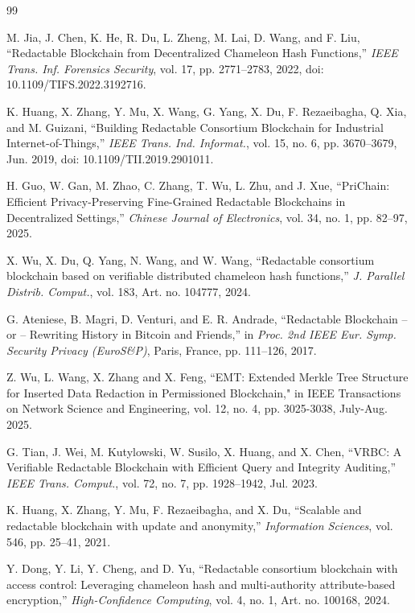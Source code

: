 \documentclass[lettersize,journal]{IEEEtran}
\begin{document}
\begin{thebibliography}{99}

M. Jia, J. Chen, K. He, R. Du, L. Zheng, M. Lai, D. Wang, and F. Liu,
``Redactable Blockchain from Decentralized Chameleon Hash Functions,''
\textit{IEEE Trans. Inf. Forensics Security}, vol. 17, pp. 2771--2783, 2022,
doi: 10.1109/TIFS.2022.3192716.

K. Huang, X. Zhang, Y. Mu, X. Wang, G. Yang, X. Du, F. Rezaeibagha, Q. Xia, and M. Guizani,
``Building Redactable Consortium Blockchain for Industrial Internet-of-Things,''
\textit{IEEE Trans. Ind. Informat.}, vol. 15, no. 6, pp. 3670--3679, Jun. 2019,
doi: 10.1109/TII.2019.2901011.

H. Guo, W. Gan, M. Zhao, C. Zhang, T. Wu, L. Zhu, and J. Xue,
``PriChain: Efficient Privacy-Preserving Fine-Grained Redactable Blockchains in Decentralized Settings,''
\textit{Chinese Journal of Electronics}, vol. 34, no. 1, pp. 82--97, 2025.

X. Wu, X. Du, Q. Yang, N. Wang, and W. Wang,
``Redactable consortium blockchain based on verifiable distributed chameleon hash functions,''
\textit{J. Parallel Distrib. Comput.}, vol. 183, Art. no. 104777, 2024.

G. Ateniese, B. Magri, D. Venturi, and E. R. Andrade,
``Redactable Blockchain -- or -- Rewriting History in Bitcoin and Friends,''
in \textit{Proc. 2nd IEEE Eur. Symp. Security Privacy (EuroS\&P)},
Paris, France, pp. 111--126, 2017.

Z. Wu, L. Wang, X. Zhang and X. Feng, ``EMT: Extended Merkle Tree Structure for Inserted Data Redaction in Permissioned Blockchain," in IEEE Transactions on Network Science and Engineering, vol. 12, no. 4, pp. 3025-3038, July-Aug. 2025.

G. Tian, J. Wei, M. Kutylowski, W. Susilo, X. Huang, and X. Chen,
``VRBC: A Verifiable Redactable Blockchain with Efficient Query and Integrity Auditing,''
\textit{IEEE Trans. Comput.}, vol. 72, no. 7, pp. 1928--1942, Jul. 2023.

K. Huang, X. Zhang, Y. Mu, F. Rezaeibagha, and X. Du,
``Scalable and redactable blockchain with update and anonymity,''
\textit{Information Sciences}, vol. 546, pp. 25--41, 2021.

Y. Dong, Y. Li, Y. Cheng, and D. Yu,
``Redactable consortium blockchain with access control: Leveraging chameleon hash and multi-authority attribute-based encryption,''
\textit{High-Confidence Computing}, vol. 4, no. 1, Art. no. 100168, 2024.


\end{thebibliography}
\end{document}

